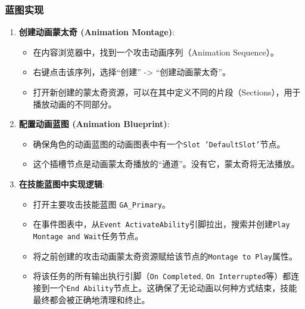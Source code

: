 \documentclass[10pt,CJKmath]{zhbook-v1}
\begin{document}
\subsubsection{蓝图实现}
\begin{enumerate}
    \item \textbf{创建动画蒙太奇 (Animation Montage)}:
    \begin{itemize}
        \item 在内容浏览器中，找到一个攻击动画序列（Animation Sequence）。
        \item 右键点击该序列，选择“创建” -> “创建动画蒙太奇”。
        \item 打开新创建的蒙太奇资源，可以在其中定义不同的片段（Sections），用于播放动画的不同部分。
    \end{itemize}
    \item \textbf{配置动画蓝图 (Animation Blueprint)}:
    \begin{itemize}
        \item 确保角色的动画蓝图的动画图表中有一个\texttt{Slot 'DefaultSlot'}节点。
        \item 这个插槽节点是动画蒙太奇播放的“通道”。没有它，蒙太奇将无法播放。
    \end{itemize}
    \item \textbf{在技能蓝图中实现逻辑}:
    \begin{itemize}
        \item 打开主要攻击技能蓝图 \texttt{GA\_Primary}。
        \item 在事件图表中，从\texttt{Event ActivateAbility}引脚拉出，搜索并创建\texttt{Play Montage and Wait}任务节点。
        \item 将之前创建的攻击动画蒙太奇资源赋给该节点的\texttt{Montage to Play}属性。
        \item 将该任务的所有输出执行引脚（\texttt{On Completed}, \texttt{On Interrupted}等）都连接到一个\texttt{End Ability}节点上。这确保了无论动画以何种方式结束，技能最终都会被正确地清理和终止。
    \end{itemize}
\end{enumerate}
\end{document}

